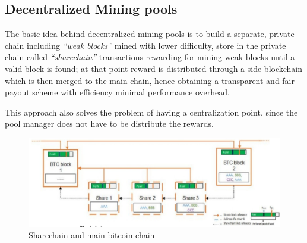\subsection{Decentralized Mining pools}
\begin{paracol}{2}
   
   The basic idea behind decentralized mining pools is to build a separate, private chain including \textit{``weak blocks''} mined with lower difficulty, store in the private chain called \textit{``sharechain''} transactions rewarding for mining weak blocks
   until a valid block is found;
   at that point reward is distributed through a side blockchain which is then merged to the main chain, hence obtaining a transparent and fair payout scheme with efficiency minimal performance overhead.

   This approach also solves the problem of having a centralization point, since the pool manager does not have to be distribute the rewards.

   \switchcolumn
   \colfill
   \begin{figure}[htbp]
      \centering
      \includegraphics[width=0.95\columnwidth]{images/bitcoin_decentralized_pool.png}
      \caption{Sharechain and main bitcoin chain}
      \label{fig:bitcoin_decentralized_pool}
   \end{figure}
   \colfill

\end{paracol}